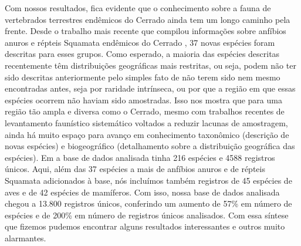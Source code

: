 \documentclass[12pt,openright,oneside,a4paper,english]{abntex2}
\begin{document}
Com nossos resultados, fica evidente que o conhecimento sobre a fauna de vertebrados terrestres endêmicos do Cerrado ainda tem um longo caminho pela frente. Desde o trabalho mais recente que compilou informações sobre anfíbios anuros e répteis Squamata endêmicos do Cerrado \citep{Azevedo2016}, 37 novas espécies foram descritas para esses grupos. Como esperado, a maioria das espécies descritas recentemente têm distribuições geográficas mais restritas, ou seja, podem não ter sido descritas anteriormente pelo simples fato de não terem sido nem mesmo encontradas antes, seja por raridade intrínseca, ou por que a região em que essas espécies ocorrem não haviam sido amostradas. Isso nos mostra que para uma região tão ampla e diversa como o Cerrado, mesmo com trabalhos recentes de levantamento faunístico sistemático voltados a reduzir lacunas de amostragem, ainda há muito espaço para avanço em conhecimento taxonômico (descrição de novas espécies) e biogeográfico (detalhamento sobre a distribuição geográfica das espécies). Em \citet{Azevedo2016} a base de dados analisada tinha 216 espécies e 4588 registros únicos. Aqui, além das 37 espécies a mais de anfíbios anuros e de répteis Squamata adicionados à base, nós incluímos também registros de 45 espécies de aves e de 42 espécies de mamíferos. Com isso, nossa base de dados analisada chegou a 13.800 registros únicos, conferindo um aumento de 57\% em número de espécies e de 200\% em número de registros únicos analisados. Com essa síntese que fizemos pudemos encontrar alguns resultados interessantes e outros muito alarmantes.
\end{document}
